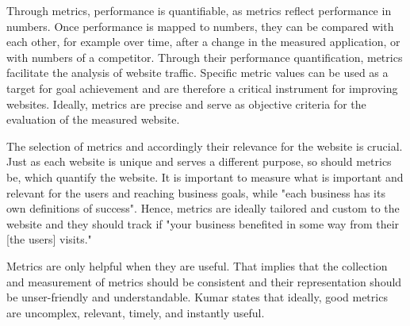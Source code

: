 Through metrics, performance is quantifiable, as metrics reflect performance in numbers.
Once performance is mapped to numbers, they can be compared with each other, for example over time, after a change in the measured application,  or with numbers of a competitor. %
Through their performance quantification, metrics facilitate the analysis of website traffic.
Specific metric values can be used as a target for goal achievement and are therefore a critical instrument for improving websites. %
Ideally, metrics are precise and serve as objective criteria for the evaluation of the measured website. %






The selection of metrics and accordingly their relevance for the website is crucial.
Just as each website is unique and serves a different purpose, so should metrics be, which quantify the website.
It is important to measure what is important and relevant for the users and reaching business goals, while "each business has its own definitions of success". %
Hence, metrics are ideally tailored and custom to the website and they should track if "your business benefited in some way from their [the users] visits." %




Metrics are only helpful when they are useful.
That implies that the collection and measurement of metrics should be consistent and their representation should be unser-friendly and understandable. %
Kumar states that ideally, good metrics are uncomplex, relevant, timely, and instantly useful.  \\%


